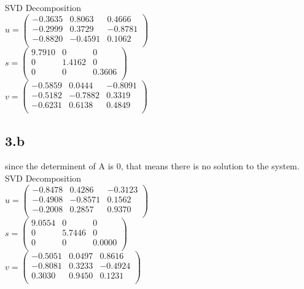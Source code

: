 \documentclass{article}
\begin{document}
SVD Decomposition\\
$u =
\begin{pmatrix}
   -0.3635 &   0.8063 &   0.4666 \\
   -0.2999 &   0.3729 &  -0.8781\\
   -0.8820 &  -0.4591 &   0.1062\\
\end{pmatrix}$\\

$s =
\begin{pmatrix}
    9.7910   &      0      &   0\\
         0  &  1.4162      &   0\\
         0   &      0  &  0.3606\\
\end{pmatrix}$\\

$v =
\begin{pmatrix}
   -0.5859 &   0.0444  & -0.8091 \\
   -0.5182 &  -0.7882  &  0.3319 \\
   -0.6231 &   0.6138  &  0.4849 \\
\end{pmatrix}$
\subsection*{3.b}
since the determinent of A is 0, that means there is no solution to the system.
SVD Decomposition\\
$u =
\begin{pmatrix}
   -0.8478  &  0.4286  & -0.3123 \\
   -0.4908  & -0.8571  &  0.1562 \\
   -0.2008 &   0.2857  &  0.9370 \\
\end{pmatrix}$\\

$s =
\begin{pmatrix}
    9.0554     &    0    &     0\\
         0   & 5.7446    &     0\\
         0   &      0   & 0.0000\\
\end{pmatrix}$\\

$v =
\begin{pmatrix}
   -0.5051  &  0.0497  &  0.8616\\
   -0.8081  &  0.3233  & -0.4924\\
    0.3030  &  0.9450  &  0.1231\\
\end{pmatrix}$
\end{document}
